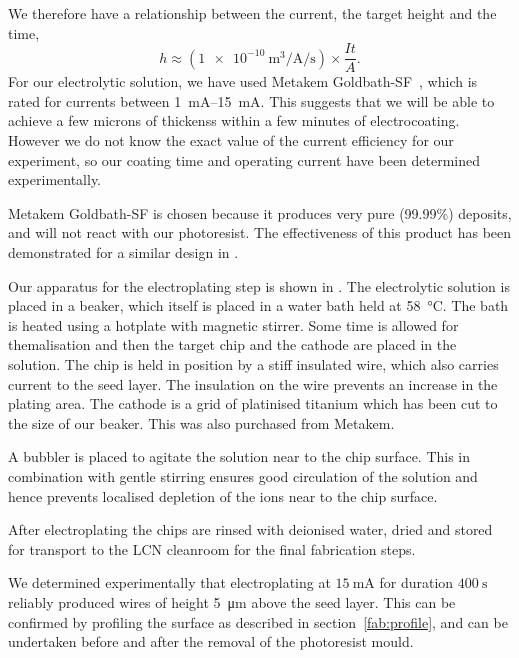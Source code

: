 We therefore have a relationship between the current, the target height and the
time,
%
\begin{equation}
  h \approx \left(
  \SI[per-mode=fraction]{1e-10}{\meter\cubed\per\ampere\per\second} \right)
  \times\frac{It}{A}.
\end{equation}
%
For our electrolytic solution, we have used Metakem Goldbath-SF~\cite{}, which
is rated for currents between \SIrange{1}{15}{\milli\ampere}. This suggests
that we will be able to achieve a few microns of thickenss within a few minutes
of electrocoating. However we do not know the exact value of the current
efficiency for our experiment, so our coating time and operating current have
been determined experimentally.

Metakem Goldbath-SF is chosen because it produces very pure (99.99\%) deposits,
and will not react with our photoresist. The effectiveness of this product has
been demonstrated for a similar design in .

Our apparatus for the electroplating step is shown in
. The electrolytic solution is placed in a
beaker, which itself is placed in a water bath held at \SI{58}{\celsius}. The
bath is heated using a hotplate with magnetic stirrer. Some time is allowed for
themalisation and then the target chip and the cathode are placed in the
solution. The chip is held in position by a stiff insulated wire, which also
carries current to the seed layer. The insulation on the wire prevents an
increase in the plating area.  The cathode is a grid of platinised titanium
which has been cut to the size of our beaker. This was also purchased from
Metakem.

A bubbler is placed to agitate the solution near to the chip surface. This in
combination with gentle stirring ensures good circulation of the solution and
hence prevents localised depletion of the ions near to the chip
surface.~\cite{Schlesinger2011} 

After electroplating the chips are rinsed with deionised water, dried and stored
for transport to the LCN cleanroom for the final fabrication steps.

We determined experimentally that electroplating at $\SI{15}{\milli\ampere}$
for duration $\SI{400}{\second}$ reliably produced wires of height
\SI{5}{\micro\meter} above the seed layer. This can be confirmed by profiling
the surface as described in section~\ref{fab:profile}, and can be undertaken
before and after the removal of the photoresist mould. 
%

